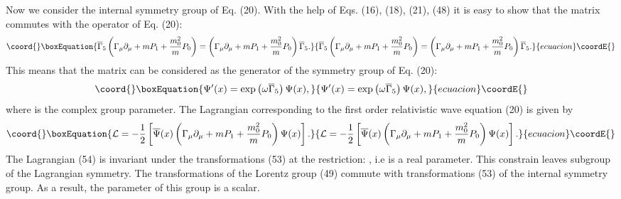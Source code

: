 \documentclass[a4paper,12pt]{article}
\begin{document}
Now we consider the internal symmetry group of Eq. (20). With the
help of Eqs. (16), (18), (21), (48) it is easy to show that the
matrix
 \coordHE{}
commutes with the operator of Eq. (20):
\begin{equation}\coord{}\boxEquation{
\overline{\Gamma }_5\left( \Gamma _\mu
\partial_\mu +mP_1 +\frac{m_0^2}{m}P_0\right)=\left( \Gamma _\mu
\partial_\mu +mP_1 +\frac{m_0^2}{m}P_0\right)\overline{\Gamma }_5
. \label{52}
}{
\overline{\Gamma }_5\left( \Gamma _\mu
\partial_\mu +mP_1 +\frac{m_0^2}{m}P_0\right)=\left( \Gamma _\mu
\partial_\mu +mP_1 +\frac{m_0^2}{m}P_0\right)\overline{\Gamma }_5
. }{ecuacion}\coordE{}\end{equation}
This means that the matrix \coordHE{} can be
considered as the generator of the symmetry group \coordHE{} of Eq.
(20):
\begin{equation}\coord{}\boxEquation{
\Psi ^{\prime }(x)=\exp \left(\omega\overline{\Gamma }_5\right)
\Psi (x) ,
 \label{53}
}{
\Psi ^{\prime }(x)=\exp \left(\omega\overline{\Gamma }_5\right)
\Psi (x) ,
 }{ecuacion}\coordE{}\end{equation}
where \myHighlight{$\omega$}\coordHE{} is the complex group parameter. The Lagrangian
corresponding to the first order relativistic wave equation (20)
is given by
\begin{equation}\coord{}\boxEquation{
\mathcal{L}=-\frac 12\left[ \overline{\Psi }(x)\left( \Gamma _\mu
\partial_\mu +mP_1 +\frac{m_0^2}{m}P_0\right) \Psi (x)\right] . \label{54}
}{
\mathcal{L}=-\frac 12\left[ \overline{\Psi }(x)\left( \Gamma _\mu
\partial_\mu +mP_1 +\frac{m_0^2}{m}P_0\right) \Psi (x)\right] . }{ecuacion}\coordE{}\end{equation}
The Lagrangian (54) is invariant under the transformations (53) at
the restriction: \myHighlight{$\omega^{*}=\omega $}\coordHE{}, i.e \myHighlight{$\omega $}\coordHE{} is a real
parameter. This constrain leaves \coordHE{} subgroup of the
Lagrangian symmetry. The transformations of the Lorentz group (49)
commute with transformations (53) of the internal symmetry group.
As a result, the parameter of this group is a scalar.
\end{document}
